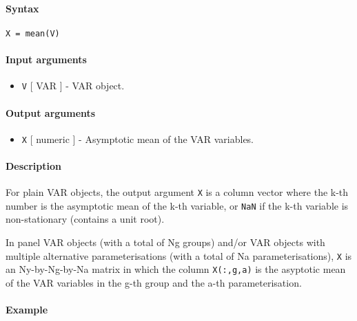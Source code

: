 


	\paragraph{Syntax}\label{syntax}

\begin{verbatim}
X = mean(V)
\end{verbatim}

\paragraph{Input arguments}\label{input-arguments}

\begin{itemize}
\itemsep1pt\parskip0pt
\item
  \texttt{V} {[} VAR {]} - VAR object.
\end{itemize}

\paragraph{Output arguments}\label{output-arguments}

\begin{itemize}
\itemsep1pt\parskip0pt
\item
  \texttt{X} {[} numeric {]} - Asymptotic mean of the VAR variables.
\end{itemize}

\paragraph{Description}\label{description}

For plain VAR objects, the output argument \texttt{X} is a column vector
where the k-th number is the asymptotic mean of the k-th variable, or
\texttt{NaN} if the k-th variable is non-stationary (contains a unit
root).

In panel VAR objects (with a total of Ng groups) and/or VAR objects with
multiple alternative parameterisations (with a total of Na
parameterisations), \texttt{X} is an Ny-by-Ng-by-Na matrix in which the
column \texttt{X(:,g,a)} is the asyptotic mean of the VAR variables in
the g-th group and the a-th parameterisation.

\paragraph{Example}\label{example}


